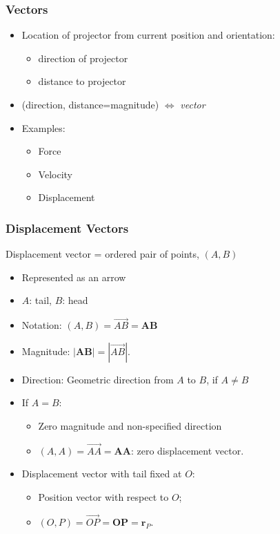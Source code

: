 
\begin{frame}
 \frametitle{Vectors}

\begin{itemize}
 \item Location of projector from current position and orientation:

\pause
\begin{itemize}
  \item direction of projector
  \item distance to projector
\end{itemize}

\pause
\item (direction, distance=magnitude) $\Longleftrightarrow$ \textit{vector}

\pause
\item Examples:
\begin{itemize}
  \item Force
  \item Velocity
  \item Displacement
\end{itemize}
\end{itemize}

\end{frame}

\begin{frame}
 \frametitle{Displacement Vectors}

\pause
  Displacement vector = ordered pair of points, $(A,B)$


\begin{itemize}
 \item Represented as an arrow
 \item $A$: tail, $B$: head
 \item Notation: $(A,B) = \overrightarrow{AB} = \textbf{AB}$
  \item Magnitude: $|\textbf{AB}| = |\overrightarrow{AB}|$. 
  \item Direction: Geometric direction from $A$ to $B$, if $A\neq B$ 
  \item If $A=B$:
  \begin{itemize}
    \item Zero magnitude and non-specified direction
    \item $(A,A) = \overrightarrow{AA} = \textbf{AA}$: zero displacement vector.
  \end{itemize}
  \item Displacement vector with tail fixed at $O$:
  \begin{itemize}
    \item Position vector with respect to $O$;
    \item $(O,P) = \overrightarrow{OP} = \textbf{OP} = \textbf{r}_P$.
  \end{itemize}
\end{itemize}

\end{frame}

